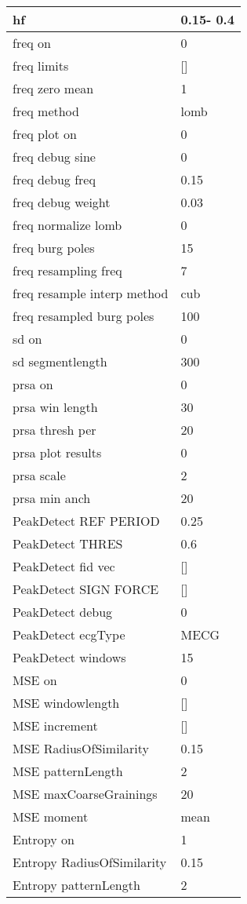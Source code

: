 \begin{tabular}{|l|l|}
hf&  0.15-   0.4\\\hline
freq on&0\\\hline
freq limits&[]\\\hline
freq zero mean&1\\\hline
freq method&lomb\\\hline
freq plot on&0\\\hline
freq debug sine&0\\\hline
freq debug freq&0.15\\\hline
freq debug weight&0.03\\\hline
freq normalize lomb&0\\\hline
freq burg poles&15\\\hline
freq resampling freq&7\\\hline
freq resample interp method&cub\\\hline
freq resampled burg poles&100\\\hline
sd on&0\\\hline
sd segmentlength&300\\\hline
prsa on&0\\\hline
prsa win length&30\\\hline
prsa thresh per&20\\\hline
prsa plot results&0\\\hline
prsa scale&2\\\hline
prsa min anch&20\\\hline
PeakDetect REF PERIOD&0.25\\\hline
PeakDetect THRES&0.6\\\hline
PeakDetect fid vec&[]\\\hline
PeakDetect SIGN FORCE&[]\\\hline
PeakDetect debug&0\\\hline
PeakDetect ecgType&MECG\\\hline
PeakDetect windows&15\\\hline
MSE on&0\\\hline
MSE windowlength&[]\\\hline
MSE increment&[]\\\hline
MSE RadiusOfSimilarity&0.15\\\hline
MSE patternLength&2\\\hline
MSE maxCoarseGrainings&20\\\hline
MSE moment&mean\\\hline
Entropy on&1\\\hline
Entropy RadiusOfSimilarity&0.15\\\hline
Entropy patternLength&2\\\hline

\end{tabular}
